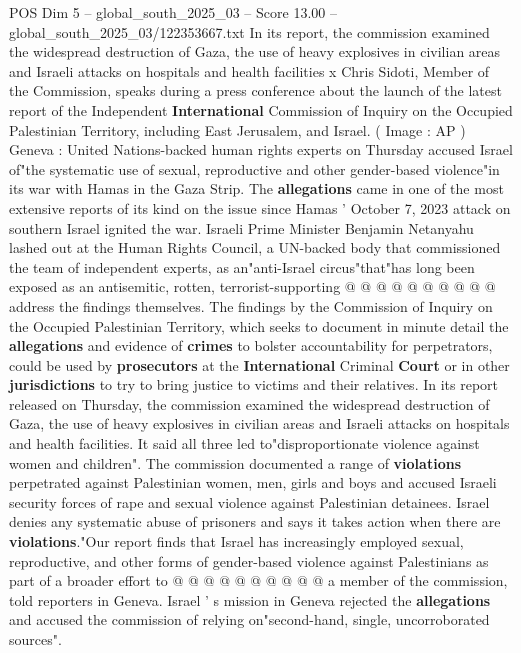 \begin{textsample}{POS Dim 5 – global\_south\_2025\_03 – Score 13.00 – global\_south\_2025\_03/122353667.txt}  \label{ex:f5_pos_186}
In its report, the commission examined the widespread destruction of Gaza, the use of heavy explosives in civilian areas and Israeli attacks on hospitals and health facilities x Chris Sidoti, Member of the Commission, speaks during a press conference about the launch of the latest report of the Independent \textbf{International} Commission of Inquiry on the Occupied Palestinian Territory, including East Jerusalem, and Israel. ( Image : AP ) Geneva : United Nations-backed human rights experts on Thursday accused Israel of"the systematic use of sexual, reproductive and other gender-based violence"in its war with Hamas in the Gaza Strip.
The \textbf{allegations} came in one of the most extensive reports of its kind on the issue since Hamas ' October 7, 2023 attack on southern Israel ignited the war.
Israeli Prime Minister Benjamin Netanyahu lashed out at the Human Rights Council, a UN-backed body that commissioned the team of independent experts, as an"anti-Israel circus"that"has long been exposed as an antisemitic, rotten, terrorist-supporting @ @ @ @ @ @ @ @ @ @ address the findings themselves.
The findings by the Commission of Inquiry on the Occupied Palestinian Territory, which seeks to document in minute detail the \textbf{allegations} and evidence of \textbf{crimes} to bolster accountability for perpetrators, could be used by \textbf{prosecutors} at the \textbf{International} Criminal \textbf{Court} or in other \textbf{jurisdictions} to try to bring justice to victims and their relatives.
In its report released on Thursday, the commission examined the widespread destruction of Gaza, the use of heavy explosives in civilian areas and Israeli attacks on hospitals and health facilities.
It said all three led to"disproportionate violence against women and children".
The commission documented a range of \textbf{violations} perpetrated against Palestinian women, men, girls and boys and accused Israeli security forces of rape and sexual violence against Palestinian detainees.
Israel denies any systematic abuse of prisoners and says it takes action when there are \textbf{violations}."Our report finds that Israel has increasingly employed sexual, reproductive, and other forms of gender-based violence against Palestinians as part of a broader effort to @ @ @ @ @ @ @ @ @ @ a member of the commission, told reporters in Geneva.
Israel ' s mission in Geneva rejected the \textbf{allegations} and accused the commission of relying on"second-hand, single, uncorroborated sources".

\end{textsample}
